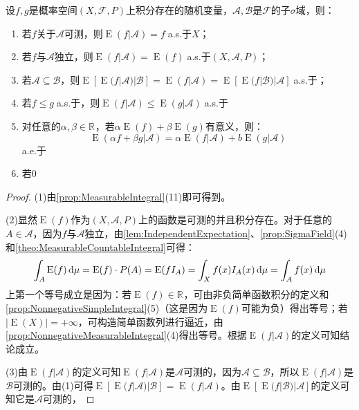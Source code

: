 \begin{theorem}
	设$f,g$是概率空间$(X,\mathscr{F},P)$上积分存在的随机变量，$\mathscr{A},\mathscr{B}$是$\mathscr{F}$的子$\sigma$域，则：
	\begin{enumerate}
		\item 若$f$关于$\mathscr{A}$可测，则$\operatorname{E}(f|\mathscr{A})=f\;$a.s.于$X$；
		\item 若$f$与$\mathscr{A}$独立，则$\operatorname{E}(f|\mathscr{A})=\operatorname{E}(f)\;$a.s.于$(X,\mathscr{A},P)$；
		\item 若$\mathscr{A}\subseteq\mathscr{B}$，则$\operatorname{E}[\operatorname{E}(f|\mathscr{A})|\mathscr{B}]=\operatorname{E}(f|\mathscr{A})=\operatorname{E}[\operatorname{E}(f|\mathscr{B})|\mathscr{A}]\;$a.s.于；
		\item 若$f\leqslant g\;$a.s.于，则$\operatorname{E}(f|\mathscr{A})\leqslant\operatorname{E}(g|\mathscr{A})\;$a.s.于
		\item 对任意的$\alpha,\beta\in\mathbb{R}^{}$，若$\alpha\operatorname{E}(f)+\beta\operatorname{E}(g)$有意义，则：
		\begin{equation*}
			\operatorname{E}(\alpha f+\beta g|\mathscr{A})=\alpha\operatorname{E}(f|\mathscr{A})+b\operatorname{E}(g|\mathscr{A})
		\end{equation*}
		a.e.于
		\item 若$0$
	\end{enumerate}
\end{theorem}
\begin{proof}
	(1)由\cref{prop:MeasurableIntegral}(11)即可得到。\par
	(2)显然$\operatorname{E}(f)$作为$(X,\mathscr{A},P)$上的函数是可测的并且积分存在。对于任意的$A\in\mathscr{A}$，因为$f$与$\mathscr{A}$独立，由\cref{lem:IndependentExpectation}、\cref{prop:SigmaField}(4)和\cref{theo:MeasurableCountableIntegral}可得：
	\begin{equation*}
		\int_{A}\operatorname{E}(f)\mathop{}\!\mathrm{d}\mu=\operatorname{E}(f)\cdot P(A)=\operatorname{E}(fI_A)=\int_{X}f(x)I_A(x)\mathop{}\!\mathrm{d}\mu=\int_{A}f(x)\mathop{}\!\mathrm{d}\mu
	\end{equation*}
	上第一个等号成立是因为：若$\operatorname{E}(f)\in\mathbb{R}^{}$，可由非负简单函数积分的定义和\cref{prop:NonnegativeSimpleIntegral}(5)（这是因为$\operatorname{E}(f)$可能为负）得出等号；若$|\operatorname{E}(X)|=+\infty$，可构造简单函数列进行逼近，由\cref{prop:NonnegativeMeasurableIntegral}(4)得出等号。根据$\operatorname{E}(f|\mathscr{A})$的定义可知结论成立。\par
	(3)由$\operatorname{E}(f|\mathscr{A})$的定义可知$\operatorname{E}(f|\mathscr{A})$是$\mathscr{A}$可测的，因为$\mathscr{A}\subseteq\mathscr{B}$，所以$\operatorname{E}(f|\mathscr{A})$是$\mathscr{B}$可测的。由(1)可得$\operatorname{E}[\operatorname{E}(f|\mathscr{A})|\mathscr{B}]=\operatorname{E}(f|\mathscr{A})$。由$\operatorname{E}[\operatorname{E}(f|\mathscr{B})|\mathscr{A}]$的定义可知它是$\mathscr{A}$可测的，
\end{proof}